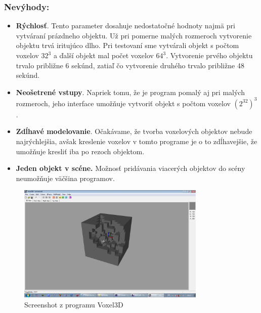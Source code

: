 \subsubsection{Nevýhody:}
\begin{itemize}
	\item  \textbf{Rýchlosť}. Tento parameter dosahuje nedostatočné hodnoty najmä pri vytváraní prázdneho objektu. Už pri pomerne malých rozmeroch vytvorenie objektu trvá iritujúco dlho. Pri testovaní sme vytvárali objekt s počtom voxelov \begin{math}32^3\end{math} a ďalší objekt mal počet voxelov \begin{math}64^3\end{math}. Vytvorenie prvého objektu trvalo približne 6 sekúnd, zatiaľ čo vytvorenie druhého trvalo približne 48 sekúnd.
	\item \textbf{Neošetrené vstupy}. Napriek tomu, že je program pomalý aj pri malých rozmeroch, jeho interface umožňuje vytvoriť objekt s počtom voxelov \begin{math}(2^{32})^3\end{math}.
	\item \textbf{Zdĺhavé modelovanie}. Očakávame, že tvorba voxelových objektov nebude najrýchlejšia, avšak kreslenie voxelov v tomto programe je o to zdĺhavejšie, že umožňuje kresliť iba po rezoch objektom.
	\item \textbf{Jeden objekt v scéne.} Možnosť pridávania viacerých objektov do scény neumožňuje väčšina programov.
\end{itemize}

\begin{figure}[ht!]
	\centering
	\includegraphics[width=0.8\textwidth]{Voxel3D.jpg}
	\caption[Voxel3D]{Screenshot z programu Voxel3D}
	\label{obr:voxel3D}
\end{figure}

